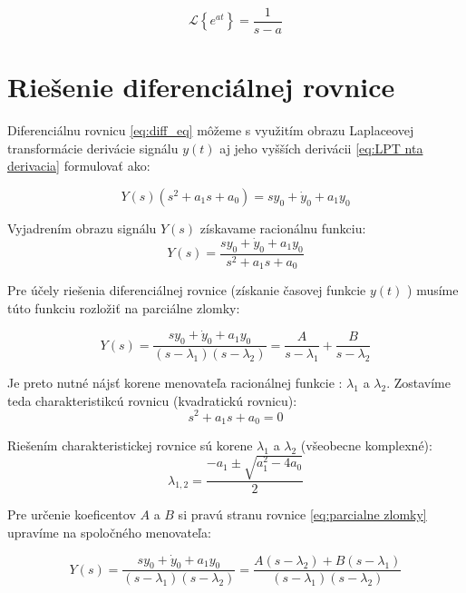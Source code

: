 \documentclass[a4paper,10pt]{article}
\begin{document}
\begin{equation}
\label{eq:LPT exp}
\mathcal{L}\left\lbrace e^{at}\right\rbrace=\frac{1}{s-a}
\end{equation}

\pagebreak

\section{Riešenie diferenciálnej rovnice}

Diferenciálnu rovnicu \eqref{eq:diff_eq} môžeme s využitím obrazu Laplaceovej transformácie derivácie signálu $y(t)$ aj jeho vyšších derivácii \eqref{eq:LPT nta derivacia} formulovať ako:

\begin{equation}
\label{eq:LPT diferencialnej rovnice}
Y(s)\left(s^2+a_1s+a_0\right)=sy_0+\dot{y}_0+a_1 y_0
\end{equation}

Vyjadrením obrazu signálu $Y(s)$ získavame racionálnu funkciu:
\begin{equation}
\label{eq:racionalna funkcia}
Y(s)=\frac{sy_0+\dot{y}_0+a_1y_0}{s^2+a_1s+a_0}
\end{equation}

Pre účely riešenia diferenciálnej rovnice (získanie časovej funkcie $y(t)$ ) musíme túto funkciu rozložiť na parciálne zlomky:

\begin{equation}
\label{eq:parcialne zlomky}
Y(s)=\frac{sy_0+\dot{y}_0+a_1 y_0}{(s-\lambda_1)(s-\lambda_2)}=\frac{A}{s-\lambda_1}+\frac{B}{s-\lambda_2}
\end{equation}

Je preto nutné nájsť korene menovateľa racionálnej funkcie : $\lambda_1$ a $\lambda_2$.
Zostavíme teda charakteristikcú rovnicu (kvadratickú rovnicu):
\begin{equation}
 s^2+a_1s+a_0=0
\end{equation}

Riešením charakteristickej rovnice sú korene $\lambda_1$ a $\lambda_2$ (všeobecne komplexné):
\begin{equation}
\label{eq:charakteristická rovnica riešenie}
 \lambda_{1,2}=\frac{-a_1\pm \sqrt{a_1^2-4a_0}}{2}
\end{equation}


Pre určenie koeficentov $A$ a $B$ si pravú stranu rovnice \eqref{eq:parcialne zlomky} upravíme na spoločného menovateľa:

\begin{equation}
\label{eq:parcialne zlomky upravene}
Y(s)=\frac{sy_0+\dot{y}_0+a_1 y_0}{(s-\lambda_1)(s-\lambda_2)}=\frac{A(s-\lambda_2)+B(s-\lambda_1)}{(s-\lambda_1)(s-\lambda_2)}
\end{equation}
\end{document}
